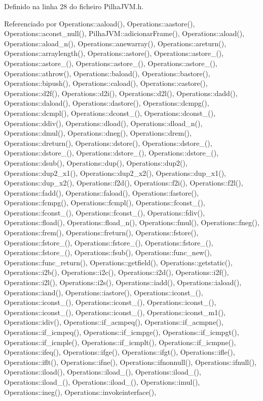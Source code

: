 Definido na linha 28 do ficheiro Pilha\+J\+V\+M.\+h.



Referenciado por Operations\+::aaload(), Operations\+::aastore(), Operations\+::aconst\+\_\+null(), Pilha\+J\+V\+M\+::adicionar\+Frame(), Operations\+::aload(), Operations\+::aload\+\_\+n(), Operations\+::anewarray(), Operations\+::areturn(), Operations\+::arraylength(), Operations\+::astore(), Operations\+::astore\+\_(), Operations\+::astore\+\_(), Operations\+::astore\+\_(), Operations\+::astore\+\_(), Operations\+::athrow(), Operations\+::baload(), Operations\+::bastore(), Operations\+::bipush(), Operations\+::caload(), Operations\+::castore(), Operations\+::d2f(), Operations\+::d2i(), Operations\+::d2l(), Operations\+::dadd(), Operations\+::daload(), Operations\+::dastore(), Operations\+::dcmpg(), Operations\+::dcmpl(), Operations\+::dconst\+\_(), Operations\+::dconst\+\_(), Operations\+::ddiv(), Operations\+::dload(), Operations\+::dload\+\_\+n(), Operations\+::dmul(), Operations\+::dneg(), Operations\+::drem(), Operations\+::dreturn(), Operations\+::dstore(), Operations\+::dstore\+\_(), Operations\+::dstore\+\_(), Operations\+::dstore\+\_(), Operations\+::dstore\+\_(), Operations\+::dsub(), Operations\+::dup(), Operations\+::dup2(), Operations\+::dup2\+\_\+x1(), Operations\+::dup2\+\_\+x2(), Operations\+::dup\+\_\+x1(), Operations\+::dup\+\_\+x2(), Operations\+::f2d(), Operations\+::f2i(), Operations\+::f2l(), Operations\+::fadd(), Operations\+::faload(), Operations\+::fastore(), Operations\+::fcmpg(), Operations\+::fcmpl(), Operations\+::fconst\+\_(), Operations\+::fconst\+\_(), Operations\+::fconst\+\_(), Operations\+::fdiv(), Operations\+::fload(), Operations\+::fload\+\_\+n(), Operations\+::fmul(), Operations\+::fneg(), Operations\+::frem(), Operations\+::freturn(), Operations\+::fstore(), Operations\+::fstore\+\_(), Operations\+::fstore\+\_(), Operations\+::fstore\+\_(), Operations\+::fstore\+\_(), Operations\+::fsub(), Operations\+::func\+\_\+new(), Operations\+::func\+\_\+return(), Operations\+::getfield(), Operations\+::getstatic(), Operations\+::i2b(), Operations\+::i2c(), Operations\+::i2d(), Operations\+::i2f(), Operations\+::i2l(), Operations\+::i2s(), Operations\+::iadd(), Operations\+::iaload(), Operations\+::iand(), Operations\+::iastore(), Operations\+::iconst\+\_(), Operations\+::iconst\+\_(), Operations\+::iconst\+\_(), Operations\+::iconst\+\_(), Operations\+::iconst\+\_(), Operations\+::iconst\+\_(), Operations\+::iconst\+\_\+m1(), Operations\+::idiv(), Operations\+::if\+\_\+acmpeq(), Operations\+::if\+\_\+acmpne(), Operations\+::if\+\_\+icmpeq(), Operations\+::if\+\_\+icmpge(), Operations\+::if\+\_\+icmpgt(), Operations\+::if\+\_\+icmple(), Operations\+::if\+\_\+icmplt(), Operations\+::if\+\_\+icmpne(), Operations\+::ifeq(), Operations\+::ifge(), Operations\+::ifgt(), Operations\+::ifle(), Operations\+::iflt(), Operations\+::ifne(), Operations\+::ifnonnull(), Operations\+::ifnull(), Operations\+::iload(), Operations\+::iload\+\_(), Operations\+::iload\+\_(), Operations\+::iload\+\_(), Operations\+::iload\+\_(), Operations\+::imul(), Operations\+::ineg(), Operations\+::invokeinterface(), 